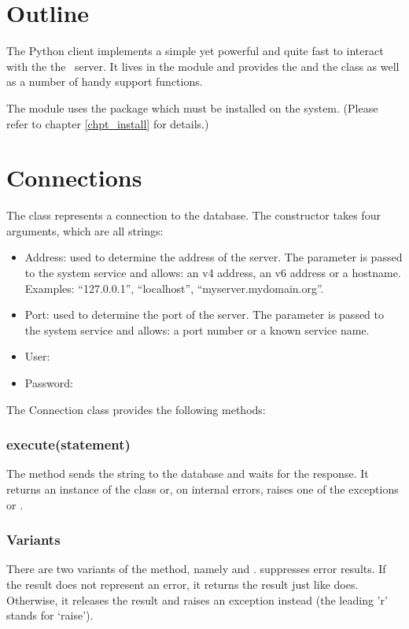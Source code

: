 \section{Outline}
The Python client implements
a simple yet powerful and quite fast
 to interact
with the the \nowdb\ server.
It lives in the module  and provides
the  and the  class
as well as a number of handy support functions.

The module uses the package 
which must be installed on the system.
(Please refer to chapter
\ref{chpt_install} for details.)

\section{Connections}
The  class represents
a  connection to the database.
The constructor takes four arguments,
which are all strings:
\begin{itemize}
\item Address:
used to determine the address of the server.
The parameter is passed to the system service
 and allows:
an v4 address,
an v6 address or
a hostname.
Examples: ``127.0.0.1'', ``localhost'',
``myserver.mydomain.org''.

\item Port:
used to determine the port of the server.
The parameter is passed to the system service
 and allows:
a port number or a known service name.

\item User:
\item Password:
\end{itemize}

The Connection class provides the following 
methods:

\subsubsection{execute(statement)}
The method sends the string  to the database
and waits for the response.
It returns an instance of the  class
or, on internal errors, raises one of the exceptions
 or .

\subsubsection{Variants}
There are two variants of the  method,
namely  and .
 suppresses error results.
If the result does not represent an error,
it returns the result just like  does.
Otherwise, it releases the result and raises
an exception instead (the leading 'r' stands
for `raise').

